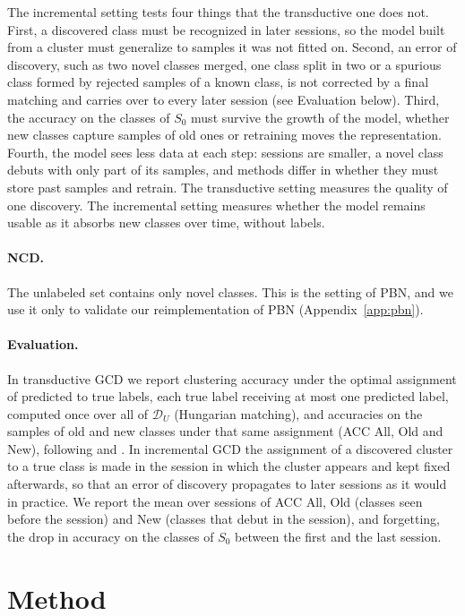 \documentclass[pdflatex,sn-basic]{sn-jnl}
\newcommand{\DU}{\mathcal{D}_U}
\begin{document}
The incremental setting tests four things that the transductive one does not. First, a discovered class must be recognized in later sessions, so the model built from a cluster must generalize to samples it was not fitted on. Second, an error of discovery, such as two novel classes merged, one class split in two or a spurious class formed by rejected samples of a known class, is not corrected by a final matching and carries over to every later session (see Evaluation below). Third, the accuracy on the classes of $S_0$ must survive the growth of the model, whether new classes capture samples of old ones or retraining moves the representation. Fourth, the model sees less data at each step: sessions are smaller, a novel class debuts with only part of its samples, and methods differ in whether they must store past samples and retrain. The transductive setting measures the quality of one discovery. The incremental setting measures whether the model remains usable as it absorbs new classes over time, without labels.

\paragraph{NCD.} The unlabeled set contains only novel classes. This is the setting of PBN, and we use it only to validate our reimplementation of PBN (Appendix~\ref{app:pbn}).

\paragraph{Evaluation.} In transductive GCD we report clustering accuracy under the optimal assignment of predicted to true labels, each true label receiving at most one predicted label, computed once over all of $\DU$ (Hungarian matching), and accuracies on the samples of old and new classes under that same assignment (ACC All, Old and New), following \citet{vaze2022gcd} and \citet{wen2023simgcd}. In incremental GCD the assignment of a discovered cluster to a true class is made in the session in which the cluster appears and kept fixed afterwards, so that an error of discovery propagates to later sessions as it would in practice. We report the mean over sessions of ACC All, Old (classes seen before the session) and New (classes that debut in the session), and forgetting, the drop in accuracy on the classes of $S_0$ between the first and the last session.

\section{Method}\label{sec:method}
\end{document}
